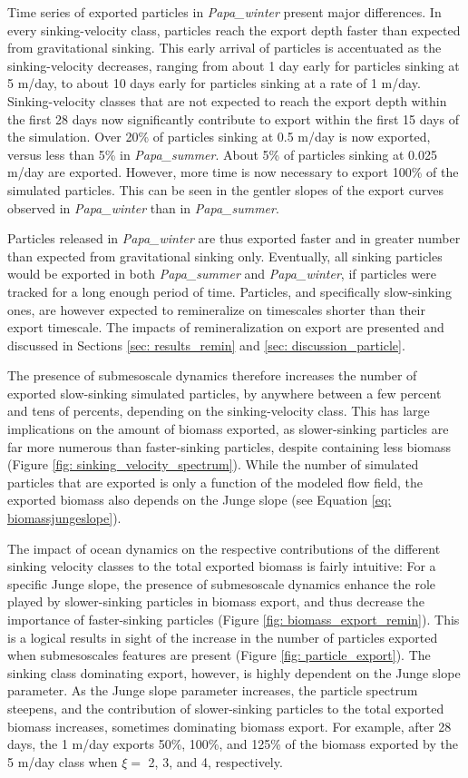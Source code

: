 \documentclass[draft,linenumbers]{agujournal2018}
\begin{document}
Time series of exported particles in \textit{Papa\_winter} present major differences. In every sinking-velocity class, particles reach the export depth faster than expected from gravitational sinking. This early arrival of particles is accentuated as the sinking-velocity decreases, ranging from about 1 day early for particles sinking at 5 m/day, to about 10 days early for particles sinking at a rate of 1 m/day. Sinking-velocity classes that are not expected to reach the export depth within the first 28 days now significantly contribute to export within the first 15 days of the simulation. Over 20\% of particles sinking at 0.5 m/day is now exported, versus less than 5\% in \textit{Papa\_summer}. About 5\% of particles sinking at 0.025 m/day are exported. However, more time is now necessary to export 100\% of the simulated particles. This can be seen in the gentler slopes of the export curves observed in \textit{Papa\_winter} than in \textit{Papa\_summer}.

Particles released in \textit{Papa\_winter} are thus exported faster and in greater number than expected from gravitational sinking only. Eventually, all sinking particles would be exported in both \textit{Papa\_summer} and \textit{Papa\_winter}, if particles were tracked for a long enough period of time. Particles, and specifically slow-sinking ones, are however expected to remineralize on timescales shorter than their export timescale. The impacts of remineralization on export are presented and discussed in Sections \ref{sec: results_remin} and \ref{sec: discussion_particle}.

The presence of submesoscale dynamics therefore increases the number of exported slow-sinking simulated particles, by anywhere between a few percent and tens of percents, depending on the sinking-velocity class. This has large implications on the amount of biomass exported, as slower-sinking particles are far more numerous than faster-sinking particles, despite containing less biomass (Figure \ref{fig: sinking_velocity_spectrum}). While the number of simulated particles that are exported is only a function of the modeled flow field, the exported biomass also depends on the Junge slope (see Equation \ref{eq: biomassjungeslope}).

The impact of ocean dynamics on the respective contributions of the different sinking velocity classes to the total exported biomass is fairly intuitive: For a specific Junge slope, the presence of submesoscale dynamics enhance the role played by slower-sinking particles in biomass export, and thus decrease the importance of faster-sinking particles (Figure \ref{fig: biomass_export_remin}). This is a logical results in sight of the increase in the number of particles exported when submesoscales features are present (Figure \ref{fig: particle_export}). The sinking class dominating export, however, is highly dependent on the Junge slope parameter. As the Junge slope parameter increases, the particle spectrum steepens, and the contribution of slower-sinking particles to the total exported biomass increases, sometimes dominating biomass export. For example, after 28 days, the 1 m/day exports 50\%, 100\%, and 125\% of the biomass exported by the 5 m/day class when $\xi =$ 2, 3, and 4, respectively.
\end{document}
